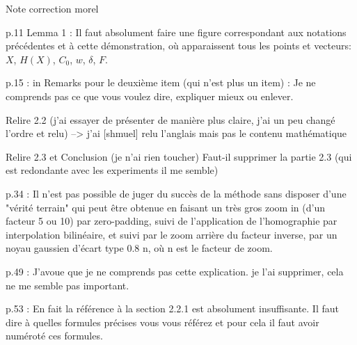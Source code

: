 Note correction morel

p.11 Lemma 1 :  Il faut absolument faire une figure correspondant aux notations précédentes et à cette démonstration, où apparaissent tous  les points et vecteurs: $X$, $H(X)$, $C_0$, $w$, $\delta$, $F$.

p.15 : in Remarks pour le deuxième item (qui n’est plus un item) :  Je ne comprends pas ce que vous voulez dire, expliquer mieux ou enlever.

Relire 2.2 (j’ai essayer de présenter de manière plus claire, j’ai un peu changé l’ordre et relu)
--> j'ai [shmuel] relu l'anglais mais pas le contenu mathématique

Relire 2.3 et Conclusion (je n’ai rien toucher) 
Faut-il supprimer la partie 2.3 (qui est redondante avec les experiments il me semble)

p.34 : Il n'est pas possible de juger du succès de la méthode sans disposer d'une "vérité terrain" qui peut être obtenue en faisant un très gros zoom in (d'un facteur 5 ou 10) par zero-padding, suivi de l'application de l'homographie par interpolation bilinéaire, et suivi par le zoom arrière du facteur inverse, par un noyau gaussien d'écart type 0.8 n, où n est  le facteur de zoom.

p.49 : J'avoue que je ne comprends pas cette explication. 
je l’ai supprimer, cela ne me semble pas important.

p.53 : En fait la référence à la section 2.2.1 est absolument insuffisante. Il faut dire à quelles formules précises vous vous référez et pour cela il faut avoir numéroté ces formules.
